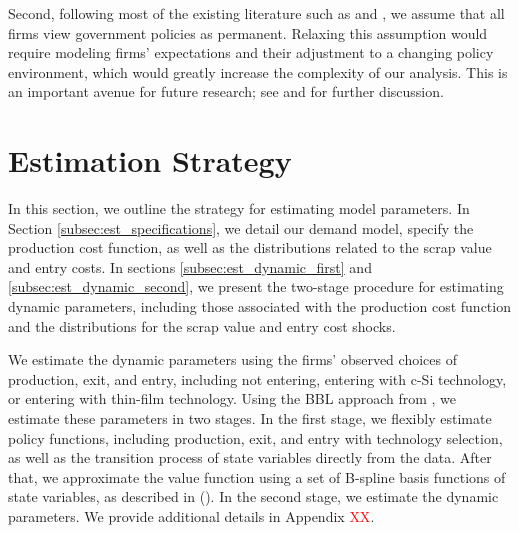 \documentclass[12pt, letter]{article}
\begin{document}
Second, following most of the existing literature such as \citet{ryan2012costs} and \citet{barwick2025industrial}, we assume that all firms view government policies as permanent.  Relaxing this assumption would require modeling firms’ expectations and their adjustment to a changing policy environment, which would greatly increase the complexity of our analysis. This is an important avenue for future research; see \citet{gowrisankaran2025policy} and \citet{chen2024dynamic} for further discussion.


\section{Estimation Strategy}
In this section, we outline the strategy for estimating model parameters. In Section \ref{subsec:est_specifications}, we detail our demand model, specify the production cost function, as well as the distributions related to the scrap value and entry costs. In sections \ref{subsec:est_dynamic_first} and \ref{subsec:est_dynamic_second}, we present the two-stage procedure for estimating dynamic parameters, including those associated with the production cost function and the distributions for the scrap value and entry cost shocks.




We estimate the dynamic parameters using the firms' observed choices of production, exit, and entry, including not entering, entering with c-Si technology, or entering with thin-film technology. Using the BBL approach from \citet{bajari2007estimating}, we estimate these parameters in two stages. In the first stage, we flexibly estimate policy functions, including production, exit, and entry with technology selection, as well as the transition process of state variables directly from the data. After that, we approximate the value function using a set of B-spline basis functions of state variables, as described in (\citet{sweeting2013dynamic}). In the second stage, we estimate the dynamic parameters. We provide additional details in Appendix \textcolor{red}{XX}.
\end{document}
